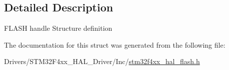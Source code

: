 \subsection{Detailed Description}
F\+L\+A\+SH handle Structure definition ~\newline
 

The documentation for this struct was generated from the following file\+:\begin{DoxyCompactItemize}
\item 
Drivers/\+S\+T\+M32\+F4xx\+\_\+\+H\+A\+L\+\_\+\+Driver/\+Inc/\mbox{\hyperlink{stm32f4xx__hal__flash_8h}{stm32f4xx\+\_\+hal\+\_\+flash.\+h}}\end{DoxyCompactItemize}
